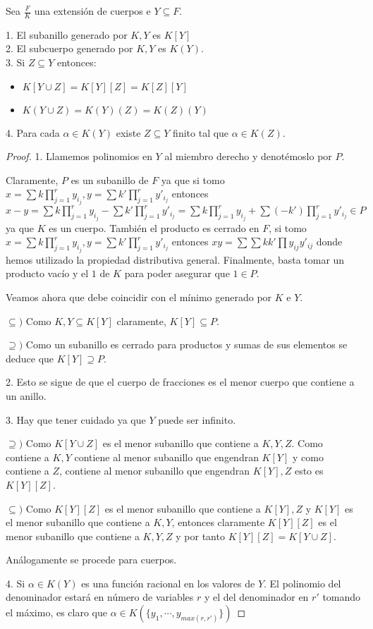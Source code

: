 \begin{proposition}
Sea $\frac{F}{K}$ una extensión de cuerpos e $Y \subseteq F$. 

1. El subanillo generado por $K,Y$ es $K[Y]$\\
2. El subcuerpo generado por $K,Y$ es $K(Y)$. \\
3. Si $Z \subseteq Y$ entonces:
\begin{itemize}
\item $K[Y \cup Z] = K[Y][Z] = K[Z][Y]$
\item $K(Y \cup Z) = K(Y)(Z) = K(Z)(Y)$
\end{itemize}

4. Para cada $\alpha \in K(Y)$ existe $Z \subseteq Y$ finito tal que $\alpha \in K(Z)$. 
\end{proposition}
\begin{proof}
1. Llamemos polinomios en $Y$ al miembro derecho y denotémoslo por $P$. 

Claramente, $P$ es un subanillo de $F$ ya que si tomo $x= \sum k \prod_{j = 1}^r y_{i_j}, y = \sum k' \prod_{j = 1}^r y'_{i_j}$ entonces $x-y = \sum k \prod_{j = 1}^r y_{i_j} - \sum k' \prod_{j = 1}^r y'_{i_j} = \sum k \prod_{j = 1}^r y_{i_j} + \sum (-k') \prod_{j = 1}^r y'_{i_j} \in P$ ya que $K$ es un cuerpo. También el producto es cerrado en $F$, si tomo $x= \sum k \prod_{j = 1}^r y_{i_j}, y = \sum k' \prod_{j = 1}^r y'_{i_j}$ entonces $xy = \sum \sum kk' \prod y_{ij}y'_{ij}$ donde hemos utilizado la propiedad distributiva general. Finalmente, basta tomar un producto vacío y el $1$ de $K$ para poder asegurar que $1 \in P$. 

Veamos ahora que debe coincidir con el mínimo generado por $K$ e $Y$. 

$\subseteq)$ Como $K,Y \subseteq K[Y]$ claramente, $K[Y] \subseteq P$. 

$\supseteq)$ Como un subanillo es cerrado para productos y sumas de sus elementos se deduce que $K[Y] \supseteq P$. 

2. Esto se sigue de que el cuerpo de fracciones es el menor cuerpo que contiene a un anillo. 

3. Hay que tener cuidado ya que $Y$ puede ser infinito. 

$\supseteq)$ Como $K[Y \cup Z]$ es el menor subanillo que contiene a $K,Y,Z$. 
Como contiene a $K,Y$ contiene al menor subanillo que engendran $K[Y]$ y como contiene a $Z$, contiene al menor subanillo que engendran $K[Y],Z$ esto es $K[Y][Z]$.

$\subseteq)$ Como $K[Y][Z]$ es el menor subanillo que contiene a $K[Y],Z$ y $K[Y]$ es el menor subanillo que contiene a $K,Y$, entonces claramente $K[Y][Z]$ es el menor subanillo que contiene a $K,Y,Z$ y por tanto $K[Y][Z] = K[Y \cup Z]$. 

Análogamente se procede para cuerpos. 

4. Si $\alpha \in K(Y)$ es una función racional en los valores de $Y$. El polinomio del denominador estará en número de variables $r$ y el del denominador en $r'$ tomando el máximo, es claro que $\alpha \in K(\{y_1,\cdots,y_{max(r,r')} \} )$
\end{proof} 

